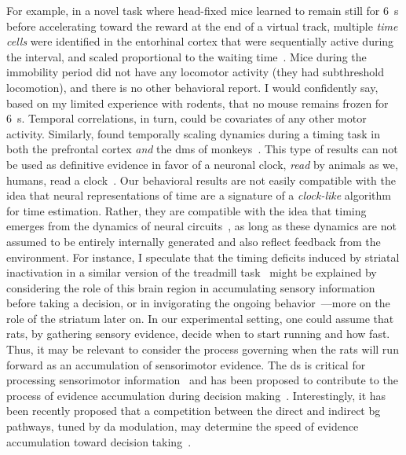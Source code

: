 For example, in a novel task where head-fixed mice learned to remain still for 6~s before accelerating toward the reward at the end of a virtual track, multiple \textit{time cells} were identified in the entorhinal cortex that were sequentially active during the interval, and scaled proportional to the waiting time~\cite{Heys2018NN}.
Mice during the immobility period did not have any locomotor activity (they had subthreshold locomotion), and there is no other behavioral report.
I would confidently say, based on my limited experience with rodents, that no mouse remains frozen for 6~s.
Temporal correlations, in turn, could be covariates of any other motor activity.
Similarly,  found temporally scaling dynamics during a timing task in both the prefrontal cortex \textit{and} the \gls{dms} of monkeys~\cite{JazayeriNN2018}.
This type of results can not be used as definitive evidence in favor of a neuronal clock, \emph{read} by animals as we, humans, read a clock~\cite{Krakauer2017Neuron, Buzsaki2017SciRev, Buzsaki2018TICS}.
Our behavioral results are not easily compatible with the idea that neural representations of time are a signature of a \emph{clock-like} algorithm for time estimation.
Rather, they are compatible with the idea that timing emerges from the dynamics of neural circuits~\cite{Paton2018NeuronRev}, as long as these dynamics are not assumed to be entirely internally generated and also reflect feedback from the environment.
For instance, I speculate that the timing deficits induced by striatal inactivation in a similar version of the treadmill task~\cite{Rueda2015NN} might be explained by considering the role of this brain region in accumulating sensory information before taking a decision, or in invigorating the ongoing behavior~\cite{Yartsev2018eLife,Dunovan2016FrontNeurosci}---more on the role of the striatum later on.
In our experimental setting, one could assume that rats, by gathering sensory evidence, decide when to start running and how fast.
Thus, it may be relevant to consider the process governing when the rats will run forward as an accumulation of sensorimotor evidence.
The \gls{ds} is critical for processing sensorimotor information~\cite{Robbe2018} and has been proposed to contribute to the process of evidence accumulation during decision making~\cite{Yartsev2018eLife}.
Interestingly, it has been recently proposed that a competition between the direct and indirect \gls{bg} pathways, tuned by \gls{da} modulation, may determine the speed of evidence accumulation toward decision taking~\cite{Dunovan2016FrontNeurosci}.
